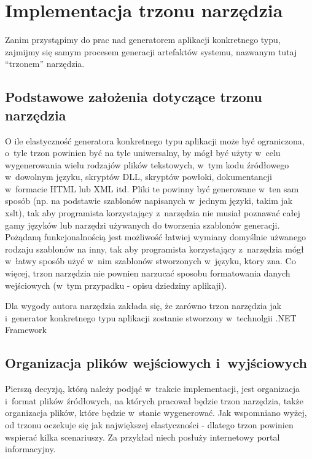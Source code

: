 \chapter{Implementacja trzonu narzędzia} \label{chap:implementation:core}

Zanim przystąpimy do prac nad generatorem aplikacji konkretnego typu, zajmijmy się samym procesem generacji artefaktów systemu, nazwanym tutaj ``trzonem'' narzędzia.



\section{Podstawowe założenia dotyczące trzonu narzędzia}

O ile elastyczność generatora konkretnego typu aplikacji może być ograniczona, o~tyle trzon powinien być na tyle uniwersalny, by mógł być użyty w~celu wygenerowania wielu rodzajów plików tekstowych, w~tym kodu źródłowego w~dowolnym języku, skryptów DLL, skryptów powłoki, dokumentancji w~formacie HTML lub XML itd.
Pliki te powinny być generowane w~ten sam sposób (np. na podstawie szablonów napisanych w~jednym języki, takim jak xslt), tak aby programista korzystający z~narzędzia nie musiał poznawać całej gamy języków lub narzędzi używanych do tworzenia szablonów generacji.
Pożądaną funkcjonalnością jest możliwość łatwiej wymiany domyślnie użwanego rodzaju szablonów na inny, tak aby programista korzystający z~narzędzia mógł w~łatwy sposób użyć w~nim szablonów stworzonych w~języku, ktory zna.
Co więcej, trzon narzędzia nie pownien narzucać sposobu formatowania danych wejściowych (w~tym przypadku - opisu dziedziny aplikaji).

Dla wygody autora narzędzia zakłada się, że zarówno trzon narzędzia jak i~generator konkretnego typu aplikacji zostanie stworzony w~technolgii .NET Framework



\section{Organizacja plików wejściowych i~wyjściowych}

Pierszą decyzją, którą należy podjąć w~trakcie implementacji, jest organizacja i~format plików źródłowych, na których pracował będzie trzon narzędzia, także organizacja plików, które będzie w~stanie wygenerować.
Jak wspomniano wyżej, od trzonu oczekuje się jak największej elastyczności - dlatego trzon powinien wspierać kilka scenariuszy.
Za przykład niech posłuży internetowy portal informacyjny.


